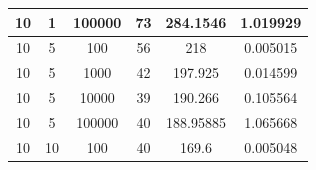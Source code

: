 \documentclass[11pt,a4paper]{report}
\begin{document}
\begin{table}[H]
{\begin{tabular}{c|c|c|c|c|c}
10                                                                                   & 1                                                                                      & 100000                                                                    & 73                                                                                        & 284.1546                                                                  & 1.019929              \\ \hline
10                                                                                   & 5                                                                                      & 100                                                                       & 56                                                                                        & 218                                                                       & 0.005015              \\
10                                                                                   & 5                                                                                      & 1000                                                                      & 42                                                                                        & 197.925                                                                   & 0.014599              \\
10                                                                                   & 5                                                                                      & 10000                                                                     & 39                                                                                        & 190.266                                                                   & 0.105564              \\
10                                                                                   & 5                                                                                      & 100000                                                                    & 40                                                                                        & 188.95885                                                                 & 1.065668              \\ \hline
10                                                                                   & 10                                                                                     & 100                                                                       & 40                                                                                        & 169.6                                                                     & 0.005048              \\

\end{tabular}}
\end{table}
\end{document}

